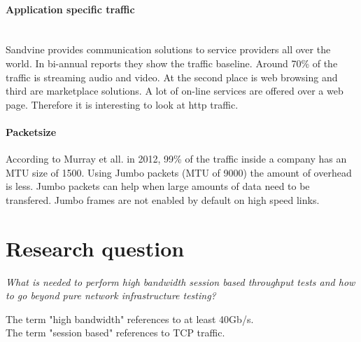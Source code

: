 \paragraph{Application specific traffic}\mbox{}\\
Sandvine provides communication solutions to service providers all over the world. In bi-annual reports they show the traffic baseline. Around 70\% of the traffic is streaming audio and video. At the second place is web browsing and third are marketplace solutions. A lot of on-line services are offered over a web page. 
Therefore it is interesting to look at http traffic.

\paragraph{Packetsize}\label{par:packetsize}
According to Murray et all. \cite{murray2012state}  in 2012, 99\% of the traffic inside a company has an MTU size of 1500. Using Jumbo packets (MTU of 9000) the amount of overhead is less. Jumbo packets can help when large amounts of data need to be transfered. Jumbo frames are not enabled by default on high speed links.  

\section{Research question}\label{sec:researchquestion}

\begin{center}
\textit{What is needed to perform high bandwidth session based throughput tests and how to go beyond pure network infrastructure testing?} \\
\end{center}
The term "high bandwidth" references to at least 40Gb/s. \\
The term "session based" references to TCP traffic. \\


